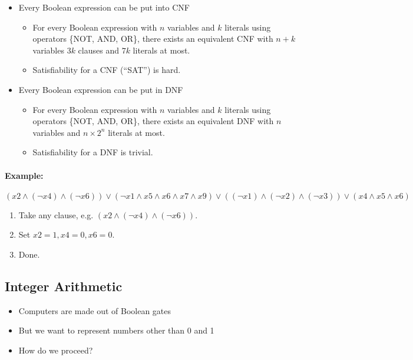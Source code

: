 \documentclass[12pt]{article}
\begin{document}
\begin{itemize}
    \item Every Boolean expression can be put into CNF
    \begin{itemize}
        \item For every Boolean expression with $n$ variables and $k$ literals using operators \{NOT, AND, OR\}, there exists an equivalent CNF with $n + k$ variables $3k$ clauses and $7k$ literals at most.
        \item Satisfiability for a CNF (``SAT'') is hard.
    \end{itemize}
    \item Every Boolean expression can be put in DNF
    \begin{itemize}
        \item For every Boolean expression with $n$ variables and $k$ literals using operators \{NOT, AND, OR\}, there exists an equivalent DNF with $n$ variables and $n \times 2^n$ literals at most.
        \item Satisfiability for a DNF is trivial.
    \end{itemize}
\end{itemize}

\paragraph{Example:}
$(x2 \land (\neg x4) \land (\neg x6)) 
\lor 
(\neg x1 \land x5 \land x6 \land x7 \land x9)
\lor 
((\neg x1) \land (\neg x2) \land (\neg x3))
\lor 
(x4 \land x5 \land x6)$

\begin{enumerate}
    \item Take any clause, e.g. $(x2 \land (\neg x4) \land (\neg x6))$.
    \item Set $x2 = 1, x4 = 0, x6 = 0$.
    \item Done.
\end{enumerate}





\subsection{Integer Arithmetic}

\begin{itemize}
    \item Computers are made out of Boolean gates
    \item But we want to represent numbers other than 0 and 1
    \item How do we proceed?
\end{itemize}
\end{document}
